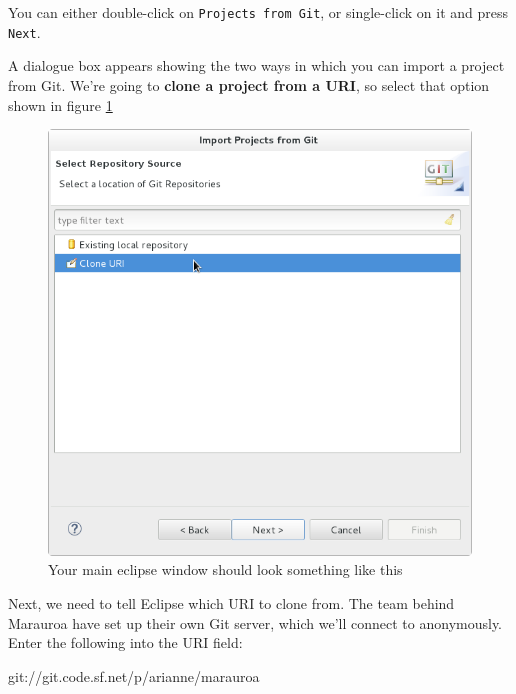 \documentclass[
]{book}
\newenvironment{Shaded}{\begin{snugshade}}{\end{snugshade}}
\newcommand{\NormalTok}[1]{#1}
\begin{document}
You can either double-click on \texttt{Projects\ from\ Git}, or single-click on it and press \texttt{Next}.

A dialogue box appears showing the two ways in which you can import a project from Git. We're going to \textbf{clone a project from a URI}, so select that option shown in figure \ref{fig:eclipseCloneFromURI-fig}

\begin{figure}

{\centering \includegraphics[width=1\linewidth]{images/1.4.eclipseCloneFromURI} 

}

\caption{Your main eclipse window should look something like this}\label{fig:eclipseCloneFromURI-fig}
\end{figure}

Next, we need to tell Eclipse which URI to clone from. The team behind Marauroa have set up their own Git server, which we'll connect to anonymously. Enter the following into the URI field:

\begin{Shaded}
\begin{Highlighting}[]
\NormalTok{git://git.code.sf.net/p/arianne/marauroa}
\end{Highlighting}
\end{Shaded}
\end{document}
